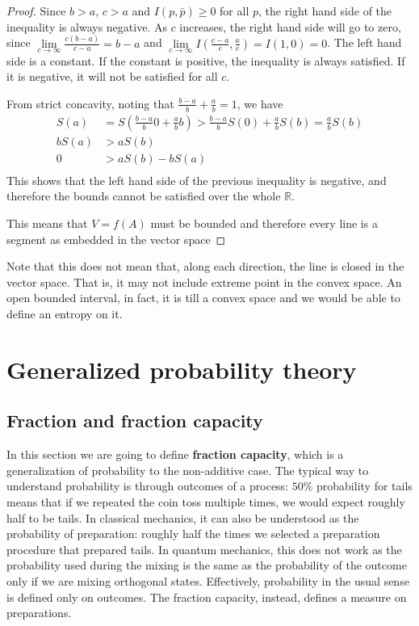 \begin{proof}
	Since $b > a$, $c > a$ and $I(p,\bar{p}) \geq 0$ for all $p$, the right hand side of the inequality is always negative. As $c$ increases, the right hand side will go to zero, since $\lim\limits_{c\to \infty}\frac{c(b-a)}{c-a} = b-a$ and $\lim\limits_{c\to \infty} I\left(\frac{c-a}{c}, \frac{a}{c}\right) = I(1,0) = 0$. The left hand side is a constant. If the constant is positive, the inequality is always satisfied. If it is negative, it will not be satisfied for all $c$.
	
	From strict concavity, noting that $\frac{b-a}{b} + \frac{a}{b} = 1$, we have
	\begin{equation}
		\begin{aligned}
			S(a) &= S\left(\frac{b-a}{b} 0 + \frac{a}{b} b\right) > \frac{b-a}{b} S(0) + \frac{a}{b} S(b) = \frac{a}{b} S(b)\\
			b S(a) &> a S(b)  \\
			0 &> a S(b) - b S(a)\\
		\end{aligned}
	\end{equation}
	This shows that the left hand side of the previous inequality is negative, and therefore the bounds cannot be satisfied over the whole $\mathbb{R}$.
	
	This means that $V = f(A)$ must be bounded and therefore every line is a segment as embedded in the vector space
\end{proof}

\begin{remark}
	Note that this does not mean that, along each direction, the line is closed in the vector space. That is, it may not include extreme point in the convex space. An open bounded interval, in fact, it is till a convex space and we would be able to define an entropy on it.
\end{remark}


\section{Generalized probability theory}

\subsection{Fraction and fraction capacity}


In this section we are going to define \textbf{fraction capacity}, which is a generalization of probability to the non-additive case. The typical way to understand probability is through outcomes of a process: $50\%$ probability for tails means that if we repeated the coin toss multiple times, we would expect roughly half to be tails. In classical mechanics, it can also be understood as the probability of preparation: roughly half the times we selected a preparation procedure that prepared tails. In quantum mechanics, this does not work as the probability used during the mixing is the same as the probability of the outcome only if we are mixing orthogonal states. Effectively, probability in the usual sense is defined only on outcomes. The fraction capacity, instead, defines a measure on preparations.

